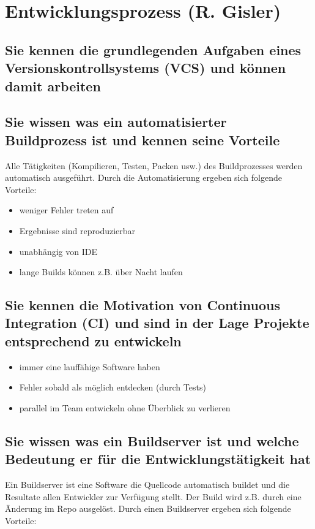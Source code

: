 \section{Entwicklungsprozess (R. Gisler)}
\label{sec:gisler}

\subsection{Sie kennen die grundlegenden Aufgaben eines Versionskontrollsystems (VCS) und können damit arbeiten}

\subsection{Sie wissen was ein automatisierter Buildprozess ist und kennen seine Vorteile}

Alle Tätigkeiten (Kompilieren, Testen, Packen usw.) des Buildprozesses werden automatisch ausgeführt. Durch die Automatisierung ergeben sich folgende Vorteile:

\begin{itemize}
	\item weniger Fehler treten auf
	\item Ergebnisse sind reproduzierbar
	\item unabhängig von IDE
	\item lange Builds können z.B. über Nacht laufen
\end{itemize}

\subsection{Sie kennen die Motivation von Continuous Integration (CI) und sind in der Lage Projekte entsprechend zu entwickeln}

\begin{itemize}
	\item immer eine lauffähige Software haben
	\item Fehler sobald als möglich entdecken (durch Tests)
	\item parallel im Team entwickeln ohne Überblick zu verlieren
\end{itemize}

\subsection{Sie wissen was ein Buildserver ist und welche Bedeutung er für die Entwicklungstätigkeit hat}

Ein Buildserver ist eine Software die Quellcode automatisch buildet und die Resultate allen Entwickler zur Verfügung stellt. Der Build wird z.B. durch eine Änderung im Repo ausgelöst. Durch einen Buildserver ergeben sich folgende Vorteile:

